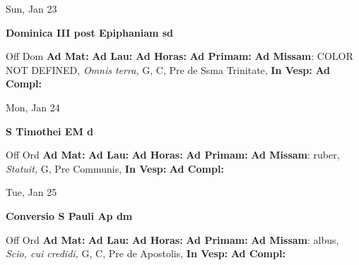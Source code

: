 \documentclass[10pt]{memoir}
\begin{document}
\begin{center}
\begin{minipage}{3.5in}
\vspace{2em}
\begin{center}Sun, Jan 23
\end{center}
\textbf{ \large Dominica III post Epiphaniam
\textnormal{\normalsize sd}}

\begin{justify}Off Dom
\textbf{Ad Mat: }
\textbf{Ad Lau: }
\textbf{Ad Horas: }
\textbf{Ad Primam: }\textbf{Ad Missam}: COLOR NOT DEFINED, \textit{Omnis terra,} G, C, Pre de Ssma Trinitate, 
\textbf{In Vesp: }
\textbf{Ad Compl: }
\end{justify}
\end{minipage}
\end{center}

\begin{center}
\begin{minipage}{3.5in}
\vspace{2em}
\begin{center}Mon, Jan 24
\end{center}
\textbf{ \large S Timothei EM
\textnormal{\normalsize d}}

\begin{justify}Off Ord
\textbf{Ad Mat: }
\textbf{Ad Lau: }
\textbf{Ad Horas: }
\textbf{Ad Primam: }\textbf{Ad Missam}: ruber, \textit{Statuit,} G, Pre Communis, 
\textbf{In Vesp: }
\textbf{Ad Compl: }
\end{justify}
\end{minipage}
\end{center}

\begin{center}
\begin{minipage}{3.5in}
\vspace{2em}
\begin{center}Tue, Jan 25
\end{center}
\textbf{ \large Conversio S Pauli Ap
\textnormal{\normalsize dm}}

\begin{justify}Off Ord
\textbf{Ad Mat: }
\textbf{Ad Lau: }
\textbf{Ad Horas: }
\textbf{Ad Primam: }\textbf{Ad Missam}: albus, \textit{Scio, cui credidi,} G, C, Pre de Apostolis, 
\textbf{In Vesp: }
\textbf{Ad Compl: }
\end{justify}
\end{minipage}
\end{center}
\end{document}
